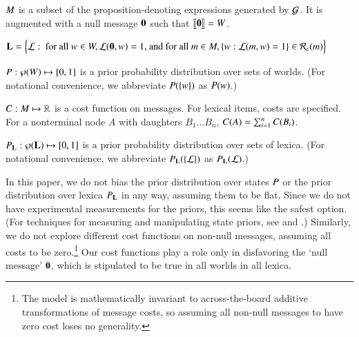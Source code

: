 \documentclass[leqno,12pt]{article}
\begin{document}
\begin{examples}
\item\label{modobjects}
  \begin{examples}
  \item\label{messages} $M$ is a subset of the
    proposition-denoting expressions generated by $\mathcal{G}$. It is
    augmented with a null message $\mathbf{0}$ such that
    $\llbracket\mathbf{0}\rrbracket = W$.

  \item\label{lexset}%
    $\mathbf{L} = \Big\{ \mathcal{L} : \text{ for all } w \in W, \mathcal{L}(\mathbf{0}, w)=1
      \text{, and for all } m \in M, \left\{ w : \mathcal{L}(m, w)=1 \right\} \in \mathcal{R}_{c}(m) \Big\}$             
  
  \item $P : \wp(W) \mapsto [0,1]$ is a prior
    probability distribution over sets of worlds.  (For notational
    convenience, we abbreviate $P(\left\{ w \right\})$ as
    $P(w)$.)

  \item $C : M \mapsto \mathbb{R}$ is a cost function on
    messages.  For lexical items, costs are specified. For a
    nonterminal node $A$ with daughters $B_{1} \ldots B_{n}$,
    $C(A) = \sum_{i=1}^{n}C(B_{i})$.

  \item $P_{\mathbf{L}} : \wp(\mathbf{L}) \mapsto [0,1]$ is a prior
    probability distribution over sets of lexica.  (For notational
    convenience, we abbreviate $P_{\mathbf{L}}(\left\{ \mathcal{L} \right\})$ as 
    $P_{\mathbf{L}}(\mathcal{L})$.)
  \end{examples}
\end{examples}

In this paper, we do not bias the prior distribution over states
$P$ or the prior distribution over lexica $P_{\mathbf{L}}$ in any
way, assuming them to be flat. Since we do not have experimental
measurements for the priors, this seems like the safest option. (For
techniques for measuring and manipulating state priors, see
\citealt{Frank:Goodman:2012} and
\citealt{Stiller:Goodman:Frank:2011}.)  Similarly, we do not explore
different cost functions on non-null messages, assuming all costs to
be zero.\footnote{The model is mathematically invariant to
  across-the-board additive transformations of message costs, so
  assuming all non-null messages to have zero cost loses no
  generality.} Our cost functions play a role only in disfavoring the
`null message' $\mathbf{0}$, which is stipulated to be true in all
worlds in all lexica.
\end{document}
